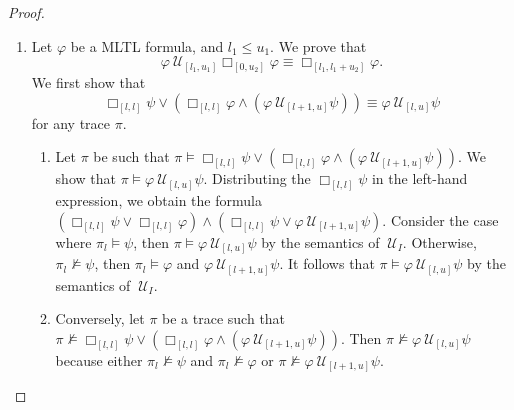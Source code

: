 \documentclass{article}
\begin{document}
\begin{proof}
\begin{enumerate}
    \item[(R8):] Let $\varphi$ be a MLTL formula, and $l_1 \leq u_1$. We prove that 
$$
    \varphi\ \mathcal{U}_{[l_1,u_1]} \Box_{[0,u_2]} \varphi \equiv \Box_{[l_1,l_1+u_2]} \varphi.
$$
We first show that
$$
    \Box_{[l,l]}{\psi} \lor (\Box_{[l,l]}{\varphi} \land ({\varphi}\ \mathcal{U}_{[l+1,u]}{\psi})) \equiv {\varphi}\ \mathcal{U}_{[l,u]}{\psi}
$$ 
for any trace $\pi$.
    \begin{enumerate}
    \item 
        Let $\pi$ be such that $\pi \models \Box_{[l,l]}{\psi} \lor (\Box_{[l,l]}{\varphi} \land ({\varphi}\ \mathcal{U}_{[l+1,u]}{\psi}))$. 
        We show that $\pi \models {\varphi}\ \mathcal{U}_{[l,u]}{\psi}$.
        Distributing the $\Box_{[l,l]}{\psi}$ in the left-hand expression, we obtain the formula $(\Box_{[l,l]}{\psi} \lor \Box_{[l,l]}{\varphi}) \land (\Box_{[l,l]}{\psi} \lor {\varphi}\ \mathcal{U}_{[l+1,u]}{\psi})$. Consider the case where $\pi_l \models \psi$, then $\pi \models {\varphi}\ \mathcal{U}_{[l,u]}{\psi}$ by the semantics of $\ \mathcal{U}_{I}{}$. Otherwise, $\pi_l \not\models \psi$, then $\pi_l \models \varphi$ and ${\varphi}\ \mathcal{U}_{[l+1,u]}{\psi}$. It follows that $\pi \models {\varphi}\ \mathcal{U}_{[l,u]}{\psi}$ by the semantics of $\ \mathcal{U}_{I}{}$.
    
    \item 
        Conversely, let $\pi$ be a trace such that $\pi \not\models \Box_{[l,l]}{\psi} \lor (\Box_{[l,l]}{\varphi} \land ({\varphi}\ \mathcal{U}_{[l+1,u]}{\psi}))$. Then $\pi \not\models {\varphi}\ \mathcal{U}_{[l,u]}{\psi}$ because either $\pi_l \not\models \psi$ and $\pi_l \not\models \varphi$ or $\pi \not\models {\varphi}\ \mathcal{U}_{[l+1,u]}{\psi}$.
    

\end{enumerate}
\end{enumerate}
\end{proof}
\end{document}
